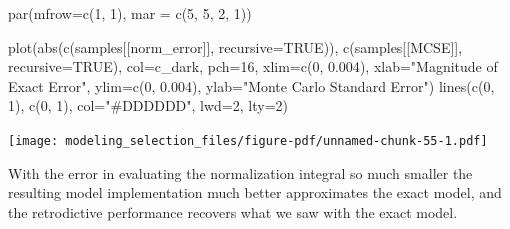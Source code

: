 \documentclass[
  letterpaper,
  DIV=11,
  numbers=noendperiod]{scrartcl}
\newenvironment{Shaded}{\begin{snugshade}}{\end{snugshade}}
\newcommand{\AttributeTok}[1]{\textcolor[rgb]{0.40,0.45,0.13}{#1}}
\newcommand{\ConstantTok}[1]{\textcolor[rgb]{0.56,0.35,0.01}{#1}}
\newcommand{\DecValTok}[1]{\textcolor[rgb]{0.68,0.00,0.00}{#1}}
\newcommand{\FloatTok}[1]{\textcolor[rgb]{0.68,0.00,0.00}{#1}}
\newcommand{\FunctionTok}[1]{\textcolor[rgb]{0.28,0.35,0.67}{#1}}
\newcommand{\NormalTok}[1]{\textcolor[rgb]{0.00,0.23,0.31}{#1}}
\newcommand{\OtherTok}[1]{\textcolor[rgb]{0.00,0.23,0.31}{#1}}
\newcommand{\SpecialCharTok}[1]{\textcolor[rgb]{0.37,0.37,0.37}{#1}}
\newcommand{\StringTok}[1]{\textcolor[rgb]{0.13,0.47,0.30}{#1}}
\begin{document}
\begin{Shaded}
\begin{Highlighting}[]
\FunctionTok{par}\NormalTok{(}\AttributeTok{mfrow=}\FunctionTok{c}\NormalTok{(}\DecValTok{1}\NormalTok{, }\DecValTok{1}\NormalTok{), }\AttributeTok{mar =} \FunctionTok{c}\NormalTok{(}\DecValTok{5}\NormalTok{, }\DecValTok{5}\NormalTok{, }\DecValTok{2}\NormalTok{, }\DecValTok{1}\NormalTok{))}

\FunctionTok{plot}\NormalTok{(}\FunctionTok{abs}\NormalTok{(}\FunctionTok{c}\NormalTok{(samples[[}\StringTok{\textquotesingle{}norm\_error\textquotesingle{}}\NormalTok{]], }\AttributeTok{recursive=}\ConstantTok{TRUE}\NormalTok{)),}
         \FunctionTok{c}\NormalTok{(samples[[}\StringTok{\textquotesingle{}MCSE\textquotesingle{}}\NormalTok{]], }\AttributeTok{recursive=}\ConstantTok{TRUE}\NormalTok{),}
     \AttributeTok{col=}\NormalTok{c\_dark, }\AttributeTok{pch=}\DecValTok{16}\NormalTok{,}
     \AttributeTok{xlim=}\FunctionTok{c}\NormalTok{(}\DecValTok{0}\NormalTok{, }\FloatTok{0.004}\NormalTok{), }\AttributeTok{xlab=}\StringTok{"Magnitude of Exact Error"}\NormalTok{,}
     \AttributeTok{ylim=}\FunctionTok{c}\NormalTok{(}\DecValTok{0}\NormalTok{, }\FloatTok{0.004}\NormalTok{), }\AttributeTok{ylab=}\StringTok{"Monte Carlo Standard Error"}\NormalTok{)}
\FunctionTok{lines}\NormalTok{(}\FunctionTok{c}\NormalTok{(}\DecValTok{0}\NormalTok{, }\DecValTok{1}\NormalTok{), }\FunctionTok{c}\NormalTok{(}\DecValTok{0}\NormalTok{, }\DecValTok{1}\NormalTok{), }\AttributeTok{col=}\StringTok{"\#DDDDDD"}\NormalTok{, }\AttributeTok{lwd=}\DecValTok{2}\NormalTok{, }\AttributeTok{lty=}\DecValTok{2}\NormalTok{)}
\end{Highlighting}
\end{Shaded}

\texttt{[image: modeling\_selection\_files/figure-pdf/unnamed-chunk-55-1.pdf]}

With the error in evaluating the normalization integral so much smaller
the resulting model implementation much better approximates the exact
model, and the retrodictive performance recovers what we saw with the
exact model.

\begin{Shaded}
\end{Shaded}
\end{document}

